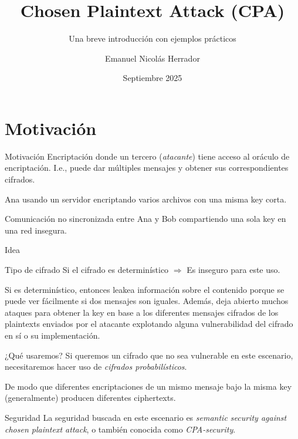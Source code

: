 

\graphicspath{{assets/}}

\title{Chosen Plaintext Attack (CPA)}
\subtitle{Una breve introducción con ejemplos prácticos}
\author[Emanuel N. Herrador]{Emanuel Nicolás Herrador}
\date{Septiembre 2025}


\frame{\titlepage}


\section{Motivación}
\begin{frame}{Motivación}
  Encriptación donde un tercero (\textit{atacante}) tiene acceso al oráculo de encriptación.
  I.e., puede dar múltiples mensajes y obtener sus correspondientes cifrados.
  \begin{example}
    Ana usando un servidor encriptando varios archivos con una misma key corta.
  \end{example}
  \begin{example}
    Comunicación no sincronizada entre Ana y Bob compartiendo una sola key en una red insegura.
  \end{example}
\end{frame}

\begin{frame}[allowframebreaks]{Idea}
  \begin{alertblock}{Tipo de cifrado}
    Si el cifrado es determinístico $\Rightarrow$ Es inseguro para este uso.
  \end{alertblock}
  Si es determinístico, entonces leakea información sobre el contenido porque se puede ver 
  fácilmente si dos mensajes son iguales.
  Además, deja abierto muchos ataques para obtener la key en base a los diferentes mensajes 
  cifrados de los plaintexts enviados por el atacante explotando alguna vulnerabilidad del 
  cifrado en sí o su implementación.
  \framebreak

  \begin{alertblock}{¿Qué usaremos?}
    Si queremos un cifrado que no sea vulnerable en este escenario, necesitaremos hacer uso 
    de \textit{cifrados probabilísticos}.
  \end{alertblock}
  De modo que diferentes encriptaciones de un mismo mensaje bajo la misma key (generalmente)
  producen diferentes ciphertexts.

  \begin{block}{Seguridad}
    La seguridad buscada en este escenario es \textit{semantic security against chosen
    plaintext attack}, o también conocida como \textit{CPA-security}.
  \end{block}
\end{frame}

